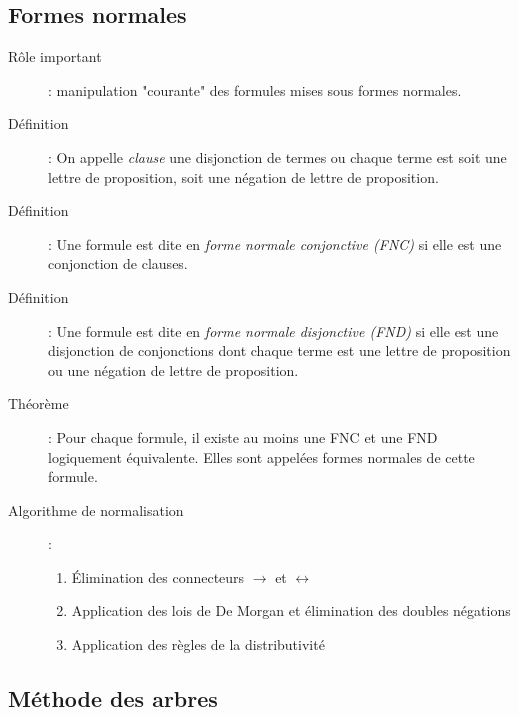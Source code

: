 \documentclass[10pt,a4paper]{article}
\begin{document}
	\subsection{Formes normales}
		\begin{description}
			\item[Rôle important]: manipulation "courante" des formules mises sous formes normales.
			\item[Définition]: On appelle \emph{clause} une disjonction de termes ou chaque terme est soit une lettre de proposition, soit une négation de lettre de proposition.
			\item[Définition]: Une formule est dite en \emph{forme normale conjonctive (FNC)} si elle est une conjonction de clauses.
			\item[Définition]: Une formule est dite en \emph{forme normale disjonctive (FND)} si elle est une disjonction de conjonctions dont chaque terme est une lettre de proposition ou une négation de lettre de proposition.
			\item[Théorème]: Pour chaque formule, il existe au moins une FNC et une FND logiquement équivalente. Elles sont appelées formes normales de cette formule.
			\item[Algorithme de normalisation]:
				\begin{enumerate}
					\item Élimination des connecteurs $\rightarrow$ et $\leftrightarrow$
					\item Application des lois de De Morgan et élimination des doubles négations
					\item Application des règles de la distributivité
				\end{enumerate}
		\end{description}
	\subsection{Méthode des arbres}
\end{document}
